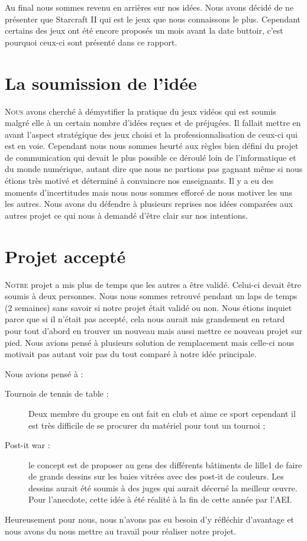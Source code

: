 Au final nous sommes revenu en arrières sur nos idées. Nous avons décidé
de ne présenter que Starcraft II qui est le jeux que nous connaissons le
plus. Cependant certains des jeux ont été encore proposés un mois avant
la date buttoir, c'est pourquoi ceux-ci sont présenté dans ce rapport.

\section{La soumission de l'idée}%
\label{sec:la_soumission_de_l_idee}

\lettrine{N}{ous} avons cherché à démystifier la pratique du jeux vidéos
qui est soumis malgré elle à un certain nombre d'idées reçues et de
préjugées.  Il fallait mettre en avant l'aspect stratégique des jeux
choisi et la professionnalisation de ceux-ci qui est en voie. Cependant
nous nous sommes heurté aux règles bien défini du projet de
communication qui devait le plus possible ce déroulé loin de
l'informatique et du monde numérique, autant dire que nous ne partions
pas gagnant même si nous étions très motivé et déterminé à convaincre
nos enseignants. Il y a eu des moments d'incertitudes mais nous nous
sommes efforcé de nous motiver les uns les autres. Nous avons du
défendre à plusieurs reprises nos idées comparées aux autres projet ce
qui nous à demandé d'être clair sur nos intentions.

\section{Projet accepté}%
\label{sec:projet_accepte}

\lettrine{N}{otre} projet a mis plus de temps que les autres a être
validé.  Celui-ci devait être soumis à deux personnes. Nous nous sommes
retrouvé pendant un laps de temps (2 semaines) sans savoir si notre
projet était validé ou non. Nous étions inquiet parce que si il n'était
pas accepté, cela nous aurait mis grandement en retard pour tout d'abord
en trouver un nouveau mais aussi mettre ce nouveau projet sur pied. Nous
avions pensé à plusieurs solution de remplacement mais celle-ci nous
motivait pas autant voir pas du tout comparé à notre idée principale.

Nous avions pensé à :

\begin{description}

\item[Tournois de tennis de table :] Deux membre du groupe en ont fait en
club et aime ce sport cependant il est très difficile de se procurer du
matériel pour tout un tournoi ;

\item[Post-it war :] le concept est de proposer au gens des différents
bâtiments de lille1 de faire de grands dessins sur les baies vitrées
avec des post-it de couleurs. Les dessins aurait été soumis à des juges
qui aurait décerné la meilleur \oe{}uvre.  Pour l'anecdote, cette idée à
été réalité à la fin de cette année par l'AEI.

\end{description}

Heureusement pour nous, nous n'avons pas eu besoin d'y réfléchir
d'avantage et nous avons du nous mettre au travail pour réaliser notre
projet.

